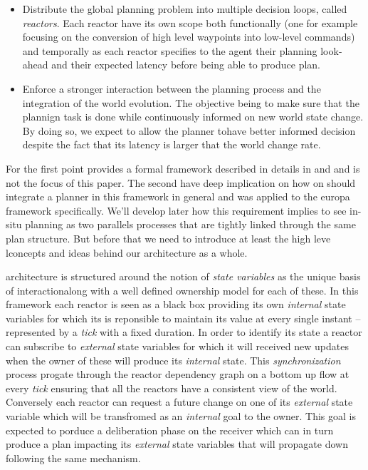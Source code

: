 \begin{itemize}

\item Distribute the global planning problem into multiple decision
  loops, called {\em reactors}. Each reactor have its own scope both 
  functionally (one for example focusing on the conversion of high 
  level waypoints into low-level commands) and temporally as 
  each reactor specifies to the agent their planning look-ahead and
  their expected latency before being able to produce plan.

\item Enforce a stronger interaction between the planning process 
  and the integration of the world evolution. The objective being to
  make sure that the plannign task is done while continuously informed 
  on new world state change. By doing so, we expect to allow the planner
  tohave better informed decision despite the fact that its latency is
  larger that the world change rate.

\end{itemize}

For the first point \rx provides a formal framework described in
details in \cite{py10} and \cite{rajan12} and is not the focus of this
paper. The second have deep implication on how on should integrate a
planner in this framework in general and was applied to the europa
framework specifically. We'll develop later how this requirement
implies to see in-situ planning as two parallels processes that are
tightly linked through the same plan structure. But before that we
need to introduce at least the high leve lconcepts and ideas behind
our architecture as a whole.

\rx architecture is structured around the notion of {\em state
  variables} as the unique basis of interactionalong with a well
defined ownership model for each of these.  In this framework each
reactor is seen as a black box providing its own {\em internal} state
variables for which its is reponsible to maintain its value at every
single instant -- represented by a {\em tick} with a fixed
duration. In order to identify its state a reactor can subscribe to
{\em external} state variables for which it will received new updates
when the owner of these will produce its {\em internal} state. This
{\em synchronization} process progate through the reactor dependency
graph on a bottom up flow at every {\em tick} ensuring that all the
reactors have a consistent view of the world. Conversely each reactor
can request a future change on one of its {\em external} state
variable which will be transfromed as an {\em internal} goal to the
owner. This goal is expected to porduce a deliberation phase on the
receiver which can in turn produce a plan impacting its {\em external}
state variables that will propagate down following the same mechanism.

